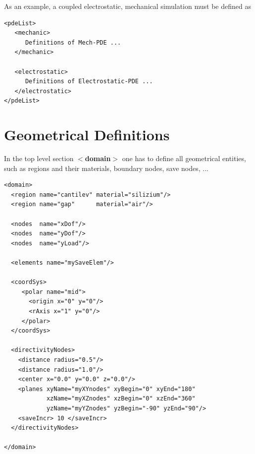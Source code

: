 \noindent
As an example, a coupled electrostatic, mechanical simulation must be
defined as
\begin{verbatim}
<pdeList>
   <mechanic>
      Definitions of Mech-PDE ...
   </mechanic>

   <electrostatic>
      Definitions of Electrostatic-PDE ...
   </electrostatic>
</pdeList>
\end{verbatim}



\section{Geometrical Definitions}
\label{sec:geometricDef}
In the top level section {\bf $<$domain$>$} one has to define all
geometrical entities, such as regions and their materials, boundary
nodes, save nodes, ...
\begin{verbatim}
<domain>
  <region name="cantilev" material="silizium"/>
  <region name="gap"      material="air"/>

  <nodes  name="xDof"/>
  <nodes  name="yDof"/>
  <nodes  name="yLoad"/>

  <elements name="mySaveElem"/>

  <coordSys>
     <polar name="mid">
       <origin x="0" y="0"/>
       <rAxis x="1" y="0"/>
     </polar>
  </coordSys>

  <directivityNodes>
    <distance radius="0.5"/>
    <distance radius="1.0"/>
    <center x="0.0" y="0.0" z="0.0"/>
    <planes xyName="myXYnodes" xyBegin="0" xyEnd="180"
            xzName="myXZnodes" xzBegin="0" xzEnd="360" 
            yzName="myYZnodes" yzBegin="-90" yzEnd="90"/>
    <saveIncr> 10 </saveIncr>
  </directivityNodes>

</domain>
\end{verbatim}

